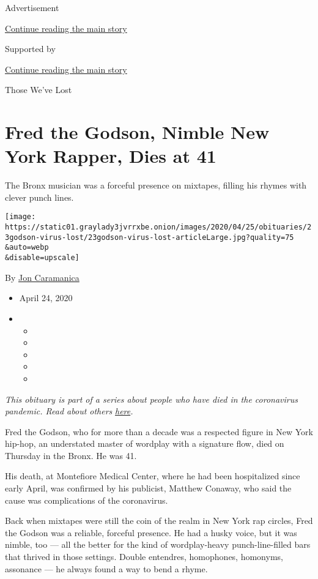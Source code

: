 Advertisement

\protect\hyperlink{after-top}{Continue reading the main story}

Supported by

\protect\hyperlink{after-sponsor}{Continue reading the main story}

Those We've Lost

\hypertarget{fred-the-godson-nimble-new-york-rapper-dies-at-41}{%
\section{Fred the Godson, Nimble New York Rapper, Dies at
41}\label{fred-the-godson-nimble-new-york-rapper-dies-at-41}}

The Bronx musician was a forceful presence on mixtapes, filling his
rhymes with clever punch lines.

\texttt{[image: https://static01.graylady3jvrrxbe.onion/images/2020/04/25/obituaries/23godson-virus-lost/23godson-virus-lost-articleLarge.jpg?quality=75\\\&auto=webp\\\&disable=upscale]}

By \href{https://www.nytimes3xbfgragh.onion/by/jon-caramanica}{Jon
Caramanica}

\begin{itemize}
\item
  April 24, 2020
\item
  \begin{itemize}
  \item
  \item
  \item
  \item
  \item
  \end{itemize}
\end{itemize}

\emph{This obituary is part of a series about people who have died in
the coronavirus pandemic. Read about others}
\href{https://www.nytimes3xbfgragh.onion/series/people-who-have-died-of-the-coronavirus}{\emph{here}}\emph{.}

Fred the Godson, who for more than a decade was a respected figure in
New York hip-hop, an understated master of wordplay with a signature
flow, died on Thursday in the Bronx. He was 41.

His death, at Montefiore Medical Center, where he had been hospitalized
since early April, was confirmed by his publicist, Matthew Conaway, who
said the cause was complications of the coronavirus.

Back when mixtapes were still the coin of the realm in New York rap
circles, Fred the Godson was a reliable, forceful presence. He had a
husky voice, but it was nimble, too --- all the better for the kind of
wordplay-heavy punch-line-filled bars that thrived in those settings.
Double entendres, homophones, homonyms, assonance --- he always found a
way to bend a rhyme.


